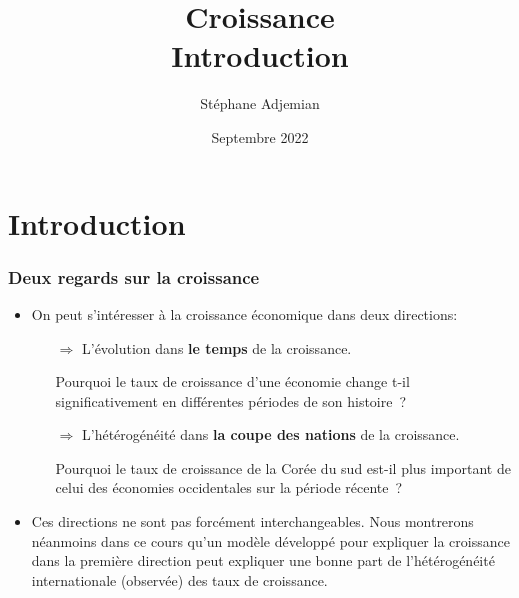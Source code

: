 \documentclass[10pt,notheorems]{beamer}
\theoremstyle{plain}
\theoremstyle{definition} %
\begin{document}
\title{Croissance\\\small{Introduction}}
\author[S. Adjemian]{St\'ephane Adjemian}
\date{Septembre 2022}

\begin{frame}
  \titlepage{}
\end{frame}

\section{Introduction}

\begin{frame}
  \frametitle{Deux regards sur la croissance}
  \begin{itemize}

  \item On peut s'intéresser à la croissance économique dans
    deux directions:

    \bigskip

    \begin{itemize}

    \item[$\Rightarrow$] L'évolution dans \textbf{le temps} de la croissance.\newline

      Pourquoi le taux de croissance d'une économie change t-il significativement en différentes périodes de son histoire~?\newline

    \item[$\Rightarrow$] L'hétérogénéité dans \textbf{la coupe des nations} de la croissance.\newline

      Pourquoi le taux de croissance de la Corée du sud est-il plus important de celui des économies occidentales sur la période récente~?

    \end{itemize}

    \bigskip

  \item Ces directions ne sont pas forcément interchangeables. Nous
    montrerons néanmoins dans ce cours qu'un modèle développé pour expliquer la
    croissance dans la première direction peut expliquer une bonne
    part de l'hétérogénéité internationale (observée) des taux de
    croissance.

  \end{itemize}

\end{frame}
\end{document}
